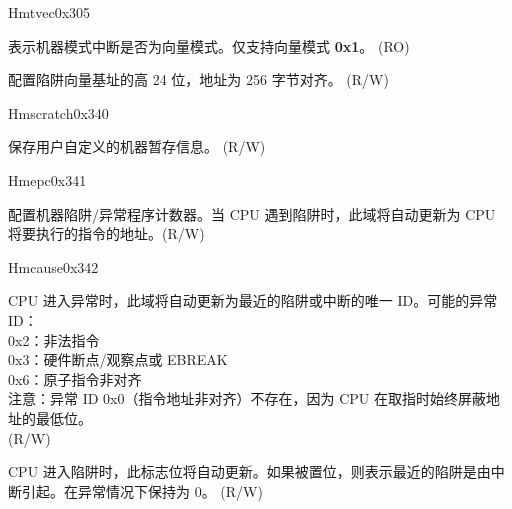\begin{register}{H}{mtvec}{0x305}\label{regdesc:LPMTVEC}
%
%
%
\regnewline%
\begin{regdesc}\begin{reglist}
\label{fielddesc:LPMTVECMODE}\item [MODE] 表示机器模式中断是否为向量模式。仅支持向量模式 \textbf{0x1}。 (RO)
\label{fielddesc:LPMTVECBASE}\item [BASE] 配置陷阱向量基址的高 24 位，地址为 256 字节对齐。 (R/W)
\end{reglist}\end{regdesc}
\end{register}

\begin{register}{H}{mscratch}{0x340}\label{regdesc:LPMSCRATCH}
%
\regnewline%
\begin{regdesc}\begin{reglist}
\label{fielddesc:LPMSCRATCH}\item [MSCRATCH] 保存用户自定义的机器暂存信息。 (R/W)
\end{reglist}\end{regdesc}
\end{register}

\begin{register}{H}{mepc}{0x341}\label{regdesc:LPMEPC}
%
\regnewline%
\begin{regdesc}\begin{reglist}
\label{fielddesc:LPMEPC}\item [MEPC] 配置机器陷阱/异常程序计数器。当 CPU 遇到陷阱时，此域将自动更新为 CPU 将要执行的指令的地址。(R/W)
\end{reglist}\end{regdesc}
\end{register}

\begin{register}{H}{mcause}{0x342}\label{regdesc:LPMCAUSE}
%
%
%
\regnewline%
\begin{regdesc}\begin{reglist}
\label{fielddesc:LPMCAUSECODE}\item [Exception Code] CPU 进入异常时，此域将自动更新为最近的陷阱或中断的唯一 ID。可能的异常 ID：\\
0x2：非法指令\\
0x3：硬件断点/观察点或 EBREAK\\
0x6：原子指令非对齐\\
注意：异常 ID 0x0（指令地址非对齐）不存在，因为 CPU 在取指时始终屏蔽地址的最低位。\\
(R/W)
\label{fielddesc:LPMCAUSEINT}\item [Interrupt Flag] CPU 进入陷阱时，此标志位将自动更新。如果被置位，则表示最近的陷阱是由中断引起。在异常情况下保持为 0。 (R/W)
\end{reglist}\end{regdesc}
\end{register}

